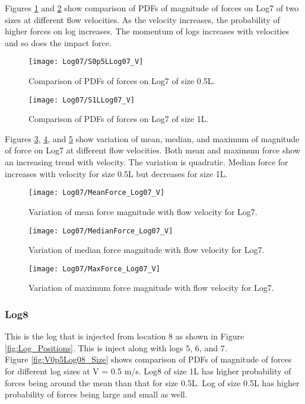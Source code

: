 \noindent Figures \ref{fig:S0p5LLog07_V} and \ref{fig:S1LLog07_V} show comparison of PDFs of magnitude of forces on Log7 of two sizes at different flow velocities. As the velocity increases, the probability of higher forces on log increases. The momentum of logs increases with velocities and so does the impact force.

\begin{figure}
\centering
\texttt{[image: Log07/S0p5LLog07\_V]}
\caption{\label{fig:S0p5LLog07_V}Comparison of PDFs of forces on Log7 of size 0.5L.}
\end{figure}
\begin{figure}
\centering
\texttt{[image: Log07/S1LLog07\_V]}
\caption{\label{fig:S1LLog07_V}Comparison of PDFs of forces on Log7 of size 1L.}
\end{figure}

\noindent Figures \ref{fig:MeanForce_Log07_V}, \ref{fig:MedianForce_Log07_V}, and \ref{fig:MaxForce_Log07_V} show variation of mean, median, and maximum of magnitude of force on Log7 at different flow velocities. Both mean and maximum force show an increasing trend with velocity. The variation is quadratic. Median force for increases with velocity for size 0.5L but decreases for size 1L.

\begin{figure}
\centering
\texttt{[image: Log07/MeanForce\_Log07\_V]}
\caption{\label{fig:MeanForce_Log07_V}Variation of mean force magnitude with flow velocity for Log7.}
\end{figure}
\begin{figure}
\centering
\texttt{[image: Log07/MedianForce\_Log07\_V]}
\caption{\label{fig:MedianForce_Log07_V}Variation of median force magnitude with flow velocity for Log7.}
\end{figure}
\begin{figure}
\centering
\texttt{[image: Log07/MaxForce\_Log07\_V]}
\caption{\label{fig:MaxForce_Log07_V}Variation of maximum force magnitude with flow velocity for Log7.}
\end{figure}

\FloatBarrier
\subsubsection{Log8}
This is the log that is injected from location 8 as shown in Figure \ref{fig:Log_Positions}. This is inject along with logs 5, 6, and 7.\\ 
Figure \ref{fig:V0p5Log08_Size} shows comparison of PDFs of magnitude of forces for different log sizes at V = 0.5 m/s. Log8 of size 1L has higher probability of forces being around the mean than that for size 0.5L. Log of size 0.5L has higher probability of forces being large and small as well.

